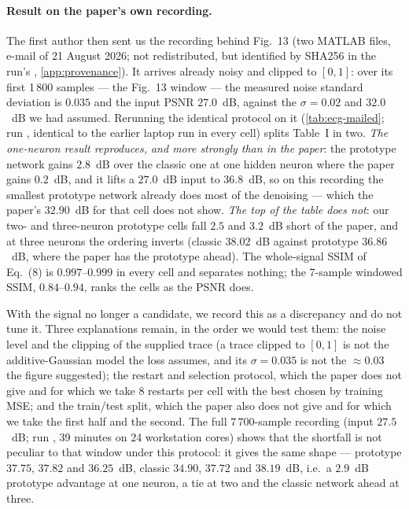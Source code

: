 \paragraph{Result on the paper's own recording.}
The first author then sent us the recording behind Fig.~13 (two MATLAB files, e-mail of
21 August 2026; not redistributed, but identified by SHA256 in the run's ,
\cref{app:provenance}).  It arrives already noisy and clipped to $[0,1]$: over its first
1\,800 samples --- the Fig.~13 window --- the measured noise standard deviation is $0.035$ and
the input PSNR $27.0$~dB, against the $\sigma = 0.02$ and $32.0$~dB we had assumed.  Rerunning
the identical protocol on it (\cref{tab:ecg-mailed}; run ,
identical to the earlier laptop run  in every cell) splits Table~I in
two.  \emph{The one-neuron result reproduces, and more
strongly than in the paper}: the prototype network gains $2.8$~dB over the classic one at one
hidden neuron where the paper gains $0.2$~dB, and it lifts a $27.0$~dB input to $36.8$~dB, so on
this recording the smallest prototype network already does most of the denoising --- which the
paper's $32.90$~dB for that cell does not show.  \emph{The top of the table does not}: our two-
and three-neuron prototype cells fall $2.5$ and $3.2$~dB short of the paper, and at three neurons
the ordering inverts (classic $38.02$~dB against prototype $36.86$~dB, where the paper has the
prototype ahead).  The whole-signal SSIM of Eq.~(8) is $0.997$--$0.999$ in every cell and
separates nothing; the 7-sample windowed SSIM, $0.84$--$0.94$, ranks the cells as the PSNR does.

With the signal no longer a candidate, we record this as a discrepancy and do not tune it.  Three
explanations remain, in the order we would test them: the noise level and the clipping of the
supplied trace (a trace clipped to $[0,1]$ is not the additive-Gaussian model the loss assumes,
and its $\sigma = 0.035$ is not the $\approx 0.03$ the figure suggested); the restart and
selection protocol, which the paper does not give and for which we take 8 restarts per cell with
the best chosen by training MSE; and the train/test split, which the paper also does not give and
for which we take the first half and the second.  The full $7\,700$-sample recording (input
$27.5$~dB; run , 39 minutes on 24 workstation cores)
shows that the shortfall is not peculiar to that window under this protocol: it gives the same shape --- prototype $37.75$, $37.82$ and $36.25$~dB,
classic $34.90$, $37.72$ and $38.19$~dB, i.e.\ a $2.9$~dB prototype advantage at one neuron, a
tie at two and the classic network ahead at three.

